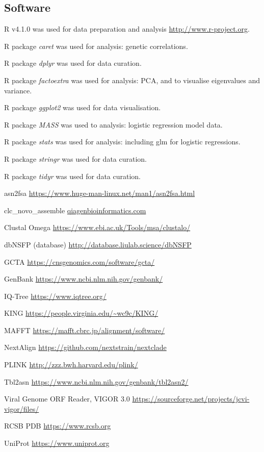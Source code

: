\documentclass{article} %
\begin{document}
\subsection{Software}
\begin{description}[noitemsep]

\item R v4.1.0 was used for data preparation and analysis \url{http://www.r-project.org}.
\item R package \textit{caret} was used for analysis: genetic correlations.
\item R package \textit{dplyr} was used for data curation.
\item R package \textit{factoextra} was used for analysis: PCA, and to visualise eigenvalues and variance.
\item R package \textit{ggplot2} was used for data visualisation.
\item R package \textit{MASS} was used to analysis: logistic regression model data.
\item R package \textit{stats} was used for analysis: including glm for logistic regressions. 
\item R package \textit{stringr} was used for data curation.
\item R package \textit{tidyr} was used for data curation.
\item asn2fsa \url{https://www.huge-man-linux.net/man1/asn2fsa.html}
\item clc\_novo\_assemble \href{https://resources.qiagenbioinformatics.com/manuals
/clcgenomicsworkbench/852/index.php?manual=De_novo_assembly.html}{qiagenbioinformatics.com} \
\item Clustal Omega \url{https://www.ebi.ac.uk/Tools/msa/clustalo/}
\item dbNSFP (database) \url{http://database.liulab.science/dbNSFP} \citep{liu2016dbnsfp}
\item GCTA \url{https://cnsgenomics.com/software/gcta/} \citep{yang2011gcta}
\item GenBank \url{https://www.ncbi.nlm.nih.gov/genbank/}
\item IQ-Tree \url{https://www.iqtree.org/} \citep{nguyen2015iq}
\item KING \url{https://people.virginia.edu/~wc9c/KING/} \citep{manichaikul_robust_2010}
\item MAFFT \url{https://mafft.cbrc.jp/alignment/software/} \citep{katoh2013mafft}
\item NextAlign \url{https://github.com/nextstrain/nextclade}
\item PLINK \url{http://zzz.bwh.harvard.edu/plink/} \citep{purcell2007plink}
\item Tbl2asn \url{https://www.ncbi.nlm.nih.gov/genbank/tbl2asn2/}
\item Viral Genome ORF Reader, VIGOR 3.0 \url{https://sourceforge.net/projects/jcvi-vigor/files/}
\item RCSB PDB \url{https://www.rcsb.org}
\item UniProt \url{https://www.uniprot.org}

\end{description}
\end{document}
